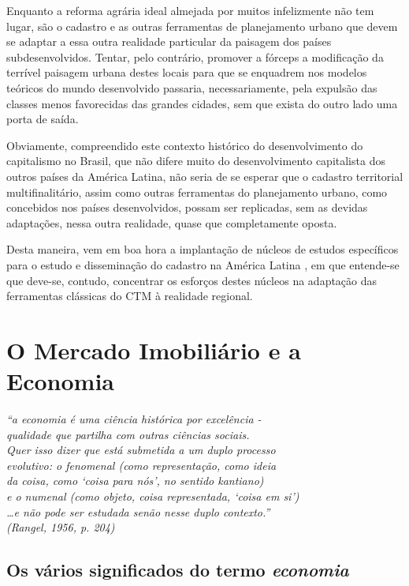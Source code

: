 \documentclass[
	12pt,				%
	oneside,			%
	a4paper,			%
	chapter=TITLE,		%
	section=TITLE,		%
	english,			%
	brazil				%
	]{abntex2}
\begin{document}
Enquanto a reforma agrária ideal almejada por muitos infelizmente não tem lugar,
são o cadastro e as outras ferramentas de planejamento urbano que devem se
adaptar a essa outra realidade particular da paisagem dos países
subdesenvolvidos. Tentar, pelo contrário, promover a fórceps a modificação da
terrível paisagem urbana destes locais para que se enquadrem nos modelos
teóricos do mundo desenvolvido passaria, necessariamente, pela expulsão das
classes menos favorecidas das grandes cidades, sem que exista do outro lado uma
porta de saída.

Obviamente, compreendido este contexto histórico do desenvolvimento do
capitalismo no Brasil, que não difere muito do desenvolvimento capitalista dos
outros países da América Latina, não seria de se esperar que o cadastro
territorial multifinalitário, assim como outras ferramentas do planejamento
urbano, como concebidos nos países desenvolvidos, possam ser replicadas, sem as
devidas adaptações, nessa outra realidade, quase que completamente oposta.

Desta maneira, vem em boa hora a implantação de núcleos de estudos específicos
para o estudo e disseminação do cadastro na América Latina \autocite{lalan}, em que
entende-se que deve-se, contudo, concentrar os esforços destes núcleos na
adaptação das ferramentas clássicas do CTM à realidade regional.

\hypertarget{economia}{%
\chapter{O Mercado Imobiliário e a Economia}\label{economia}}
\begin{epigrafe}
    \vspace*{\fill}
    \begin{flushright}
    \textit{``a economia é uma ciência histórica por excelência -\\
    qualidade que partilha com outras ciências sociais.\\
    Quer isso dizer que está submetida a um duplo processo\\
    evolutivo: o fenomenal (como representação, como ideia \\
    da coisa, como `coisa para nós', no sentido kantiano)\\
    e o numenal (como objeto, coisa representada, `coisa em si')\\
    \ldots e não pode ser estudada senão nesse duplo contexto.''\\
    (Rangel, 1956, p. 204)}
    \end{flushright}
\end{epigrafe}
\hypertarget{os-vuxe1rios-significados-do-termo}{%
\section{\texorpdfstring{Os vários significados do termo \emph{economia}}{Os vários significados do termo }}\label{os-vuxe1rios-significados-do-termo}}
\end{document}
